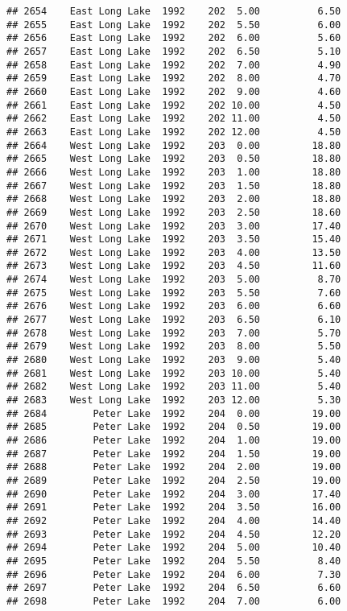 \documentclass[
]{article}
\begin{document}
\begin{verbatim}
## 2654    East Long Lake  1992    202  5.00          6.50
## 2655    East Long Lake  1992    202  5.50          6.00
## 2656    East Long Lake  1992    202  6.00          5.60
## 2657    East Long Lake  1992    202  6.50          5.10
## 2658    East Long Lake  1992    202  7.00          4.90
## 2659    East Long Lake  1992    202  8.00          4.70
## 2660    East Long Lake  1992    202  9.00          4.60
## 2661    East Long Lake  1992    202 10.00          4.50
## 2662    East Long Lake  1992    202 11.00          4.50
## 2663    East Long Lake  1992    202 12.00          4.50
## 2664    West Long Lake  1992    203  0.00         18.80
## 2665    West Long Lake  1992    203  0.50         18.80
## 2666    West Long Lake  1992    203  1.00         18.80
## 2667    West Long Lake  1992    203  1.50         18.80
## 2668    West Long Lake  1992    203  2.00         18.80
## 2669    West Long Lake  1992    203  2.50         18.60
## 2670    West Long Lake  1992    203  3.00         17.40
## 2671    West Long Lake  1992    203  3.50         15.40
## 2672    West Long Lake  1992    203  4.00         13.50
## 2673    West Long Lake  1992    203  4.50         11.60
## 2674    West Long Lake  1992    203  5.00          8.70
## 2675    West Long Lake  1992    203  5.50          7.60
## 2676    West Long Lake  1992    203  6.00          6.60
## 2677    West Long Lake  1992    203  6.50          6.10
## 2678    West Long Lake  1992    203  7.00          5.70
## 2679    West Long Lake  1992    203  8.00          5.50
## 2680    West Long Lake  1992    203  9.00          5.40
## 2681    West Long Lake  1992    203 10.00          5.40
## 2682    West Long Lake  1992    203 11.00          5.40
## 2683    West Long Lake  1992    203 12.00          5.30
## 2684        Peter Lake  1992    204  0.00         19.00
## 2685        Peter Lake  1992    204  0.50         19.00
## 2686        Peter Lake  1992    204  1.00         19.00
## 2687        Peter Lake  1992    204  1.50         19.00
## 2688        Peter Lake  1992    204  2.00         19.00
## 2689        Peter Lake  1992    204  2.50         19.00
## 2690        Peter Lake  1992    204  3.00         17.40
## 2691        Peter Lake  1992    204  3.50         16.00
## 2692        Peter Lake  1992    204  4.00         14.40
## 2693        Peter Lake  1992    204  4.50         12.20
## 2694        Peter Lake  1992    204  5.00         10.40
## 2695        Peter Lake  1992    204  5.50          8.40
## 2696        Peter Lake  1992    204  6.00          7.30
## 2697        Peter Lake  1992    204  6.50          6.60
## 2698        Peter Lake  1992    204  7.00          6.00

\end{verbatim}
\end{document}
